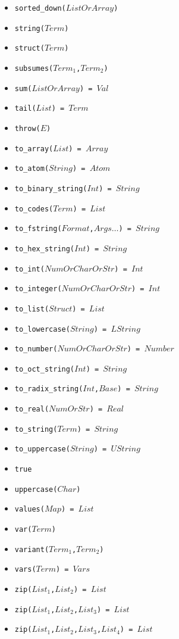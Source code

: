 \documentclass[10pt]{article}
\begin{document}
\begin{multicols}{2}
\begin{scriptsize}
\begin{itemize}
    \item \texttt{sorted\_down($ListOrArray$)} 
    \item \texttt{string($Term$)} 
    \item \texttt{struct($Term$)} 
    \item \texttt{subsumes($Term_1$,$Term_2$)}
    \item \texttt{sum($ListOrArray$) = $Val$}
    \item \texttt{tail($List$) = $Term$} 
    \item \texttt{throw($E$)}    
    \item \texttt{to\_array($List$) = $Array$} 
    \item \texttt{to\_atom($String$) = $Atom$} 
    \item \texttt{to\_binary\_string($Int$) = $String$}
    \item \texttt{to\_codes($Term$) = $List$}        
    \item \texttt{to\_fstring($Format$,$Args\ldots$) = $String$}
    \item \texttt{to\_hex\_string($Int$) = $String$}    
    \item \texttt{to\_int($NumOrCharOrStr$) = $Int$} 
    \item \texttt{to\_integer($NumOrCharOrStr$) = $Int$} 
    \item \texttt{to\_list($Struct$) = $List$} 
    \item \texttt{to\_lowercase($String$) = $LString$}
    \item \texttt{to\_number($NumOrCharOrStr$) = $Number$}
    \item \texttt{to\_oct\_string($Int$) = $String$}    
    \item \texttt{to\_radix\_string($Int$,$Base$) = $String$}
    \item \texttt{to\_real($NumOrStr$) = $Real$} 
    \item \texttt{to\_string($Term$) = $String$}        
    \item \texttt{to\_uppercase($String$) = $UString$}
    \item \texttt{true}
    \item \texttt{uppercase($Char$)} 
    \item \texttt{values($Map$) = $List$} 
    \item \texttt{var($Term$)} 
    \item \texttt{variant($Term_1$,$Term_2$)}
    \item \texttt{vars($Term$) = $Vars$}
    \item \texttt{zip($List_1$,$List_2$) = $List$} 
    \item \texttt{zip($List_1$,$List_2$,$List_3$) = $List$} 
    \item \texttt{zip($List_1$,$List_2$,$List_3$,$List_4$) = $List$} 
\end{itemize}
\end{scriptsize}
%

\end{multicols}
\end{document}
